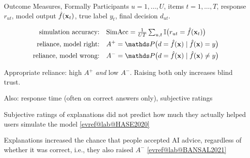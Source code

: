 \documentclass[10pt,compress,t,notes=noshow, xcolor=table]{beamer}
\makeatletter
\newcommand{\citeref}[1]{%
  \href{\csname evref@url@#1\endcsname}{[\csname evref@lab@#1\endcsname]}}
\makeatother
\begin{document}
\begin{framev}[align=mid]{Outcome Measures, Formally}
Participants $u = 1,\dots,U$, items $t = 1,\dots,T$, response $r_{ut}$, model output $\hat{f}(\mathbf{x}_t)$, true label $y_t$, final decision $d_{ut}$.
\begin{definition}
\vspace{-0.4em}
\begin{align*}
\text{simulation accuracy:} \quad & \mathrm{SimAcc} = \tfrac{1}{UT}\textstyle\sum_{u,t}\I\big(r_{ut} = \fh(\xv_t)\big)\\
\text{reliance, model right:} \quad & A^+ = \P\big(d = \fh(\xv) \mid \fh(\xv) = y\big)\\
\text{reliance, model wrong:} \quad & A^- = \P\big(d = \fh(\xv) \mid \fh(\xv) \neq y\big)
\end{align*}
\end{definition}
\begin{itemizeS}
\item Appropriate reliance: high $A^+$ \emph{and} low $A^-$. Raising both only increases blind trust.
\item Also: response time (often on correct answers only), subjective ratings
\end{itemizeS}
\pause
\begin{itemizeS}
\item Subjective ratings of explanations did not predict how much they actually helped users simulate the model \citeref{HASE2020}
\item Explanations increased the chance that people accepted AI advice, regardless of whether it was correct, i.e., they also raised $A^-$ \citeref{BANSAL2021}
\end{itemizeS}
\end{framev}
\end{document}
